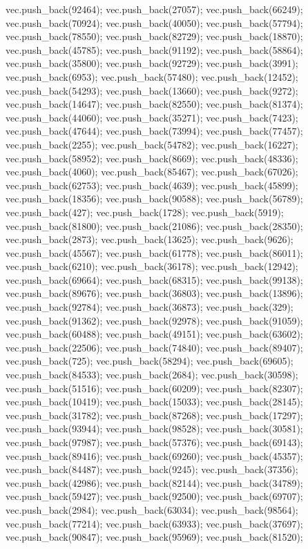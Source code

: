 vec.push_back(92464);
vec.push_back(27057);
vec.push_back(66249);
vec.push_back(70924);
vec.push_back(40050);
vec.push_back(57794);
vec.push_back(78550);
vec.push_back(82729);
vec.push_back(18870);
vec.push_back(45785);
vec.push_back(91192);
vec.push_back(58864);
vec.push_back(35800);
vec.push_back(92729);
vec.push_back(3991);
vec.push_back(6953);
vec.push_back(57480);
vec.push_back(12452);
vec.push_back(54293);
vec.push_back(13660);
vec.push_back(9272);
vec.push_back(14647);
vec.push_back(82550);
vec.push_back(81374);
vec.push_back(44060);
vec.push_back(35271);
vec.push_back(7423);
vec.push_back(47644);
vec.push_back(73994);
vec.push_back(77457);
vec.push_back(2255);
vec.push_back(54782);
vec.push_back(16227);
vec.push_back(58952);
vec.push_back(8669);
vec.push_back(48336);
vec.push_back(4060);
vec.push_back(85467);
vec.push_back(67026);
vec.push_back(62753);
vec.push_back(4639);
vec.push_back(45899);
vec.push_back(18356);
vec.push_back(90588);
vec.push_back(56789);
vec.push_back(427);
vec.push_back(1728);
vec.push_back(5919);
vec.push_back(81800);
vec.push_back(21086);
vec.push_back(28350);
vec.push_back(2873);
vec.push_back(13625);
vec.push_back(9626);
vec.push_back(45567);
vec.push_back(61778);
vec.push_back(86011);
vec.push_back(6210);
vec.push_back(36178);
vec.push_back(12942);
vec.push_back(69664);
vec.push_back(68315);
vec.push_back(99138);
vec.push_back(89676);
vec.push_back(36803);
vec.push_back(13896);
vec.push_back(92784);
vec.push_back(36873);
vec.push_back(329);
vec.push_back(91362);
vec.push_back(92978);
vec.push_back(91059);
vec.push_back(60488);
vec.push_back(49151);
vec.push_back(63602);
vec.push_back(22506);
vec.push_back(74840);
vec.push_back(89407);
vec.push_back(725);
vec.push_back(58294);
vec.push_back(69605);
vec.push_back(84533);
vec.push_back(2684);
vec.push_back(30598);
vec.push_back(51516);
vec.push_back(60209);
vec.push_back(82307);
vec.push_back(10419);
vec.push_back(15033);
vec.push_back(28145);
vec.push_back(31782);
vec.push_back(87268);
vec.push_back(17297);
vec.push_back(93944);
vec.push_back(98528);
vec.push_back(30581);
vec.push_back(97987);
vec.push_back(57376);
vec.push_back(69143);
vec.push_back(89416);
vec.push_back(69260);
vec.push_back(45357);
vec.push_back(84487);
vec.push_back(9245);
vec.push_back(37356);
vec.push_back(42986);
vec.push_back(82144);
vec.push_back(34789);
vec.push_back(59427);
vec.push_back(92500);
vec.push_back(69707);
vec.push_back(2984);
vec.push_back(63034);
vec.push_back(98564);
vec.push_back(77214);
vec.push_back(63933);
vec.push_back(37697);
vec.push_back(90847);
vec.push_back(95969);
vec.push_back(81520);
